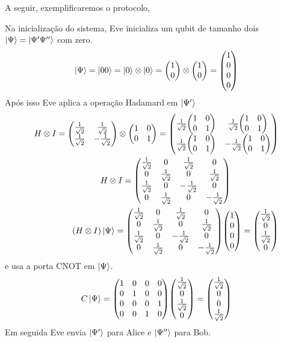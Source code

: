 \documentclass[a4paper, 12pt, oneside]{book}
\begin{document}
A seguir, exemplificaremos o protocolo,

Na inicialização do sistema, Eve inicializa um qubit de tamanho dois $\ket{\Psi}=\ket{\Psi' \Psi''}$ com zero. 
\begin{align*}
\ket{\Psi} = \ket{00} = \ket{0}\otimes \ket{0} = \mqty(1\\0) \otimes \mqty(1\\0) = \mqty(1\\0\\0\\0)
\end{align*}
Após isso Eve aplica a operação Hadamard em $\ket{\Psi'}$
\begin{align*}
H \otimes I = \mqty(\frac{1}{\sqrt{2}}&\frac{1}{\sqrt{2}}\\
				\frac{1}{\sqrt{2}}&-\frac{1}{\sqrt{2}} ) 
	\otimes \mqty(1&0\\0&1) 
= \mqty(\frac{1}{\sqrt{2}}\mqty(1&0\\0&1) & \frac{1}{\sqrt{2}}\mqty(1&0\\0&1) \\ 
	\frac{1}{\sqrt{2}}\mqty(1&0\\0&1) & -\frac{1}{\sqrt{2}}\mqty(1&0\\0&1))
	\\
H \otimes I = 
\mqty(\frac{1}{\sqrt{2}}&0&\frac{1}{\sqrt{2}}&0\\
	0&\frac{1}{\sqrt{2}}&0&\frac{1}{\sqrt{2}} \\
	\frac{1}{\sqrt{2}}&0&-\frac{1}{\sqrt{2}}&0 \\
	0&\frac{1}{\sqrt{2}}&0&-\frac{1}{\sqrt{2}}) \hspace{2cm} \\
(H \otimes I)\ket{\Psi} =  \mqty(\frac{1}{\sqrt{2}}&0&\frac{1}{\sqrt{2}}&0\\
	0&\frac{1}{\sqrt{2}}&0&\frac{1}{\sqrt{2}} \\
	\frac{1}{\sqrt{2}}&0&-\frac{1}{\sqrt{2}}&0 \\
	0&\frac{1}{\sqrt{2}}&0&-\frac{1}{\sqrt{2}}) 
	\mqty(1\\0\\0\\0) = \mqty(\frac{1}{\sqrt{2}}\\0\\ \frac{1}{\sqrt{2}}\\0)
\end{align*}
e usa a porta CNOT em $\ket{\Psi}$.
\begin{align*}
C\ket{\Psi} = \mqty(1&0&0&0\\0&1&0&0\\0&0&0&1\\0&0&1&0) 
			\mqty(\frac{1}{\sqrt{2}}\\0\\ \frac{1}{\sqrt{2}}\\0)
		= \mqty(\frac{1}{\sqrt{2}}\\0\\ 0\\ \frac{1}{\sqrt{2}})
\end{align*}
Em seguida Eve envia $\ket{\Psi'}$ para Alice e $\ket{\Psi''}$ para Bob. 
\end{document}
